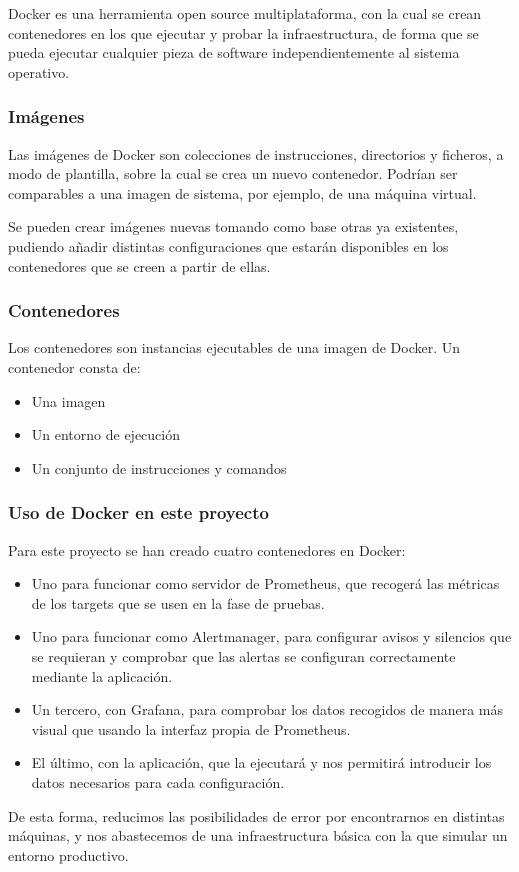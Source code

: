Docker\cite{docker} es una herramienta open source multiplataforma, con la cual se crean contenedores en los que ejecutar y probar la infraestructura, de forma que se pueda ejecutar cualquier pieza de software independientemente al sistema operativo.

\subsubsection{Imágenes}
Las imágenes\cite{docker_image} de Docker son colecciones de instrucciones, directorios y ficheros, a modo de plantilla, sobre la cual se crea un nuevo contenedor. Podrían ser comparables a una imagen de sistema, por ejemplo, de una máquina virtual.

Se pueden crear imágenes nuevas tomando como base otras ya existentes, pudiendo añadir distintas configuraciones que estarán disponibles en los contenedores que se creen a partir de ellas.

\subsubsection{Contenedores}
Los contenedores\cite{docker_container} son instancias ejecutables de una imagen\cite{docker_image} de Docker. Un contenedor consta de:
\begin{itemize}
    \item Una imagen
    \item Un entorno de ejecución
    \item Un conjunto de instrucciones y comandos
\end{itemize}

\subsubsection*{Uso de Docker en este proyecto}

Para este proyecto se han creado cuatro contenedores en Docker:
\begin{itemize}
    \item Uno para funcionar como servidor de Prometheus, que recogerá las métricas de los targets que se usen en la fase de pruebas.
    \item Uno para funcionar como Alertmanager, para configurar avisos y silencios que se requieran y comprobar que las alertas se configuran correctamente mediante la aplicación.
    \item Un tercero, con Grafana, para comprobar los datos recogidos de manera más visual que usando la interfaz propia de Prometheus.
    \item El último, con la aplicación, que la ejecutará y nos permitirá introducir los datos necesarios para cada configuración.
\end{itemize}

De esta forma, reducimos las posibilidades de error por encontrarnos en distintas máquinas, y nos abastecemos de una infraestructura básica con la que simular un entorno productivo.